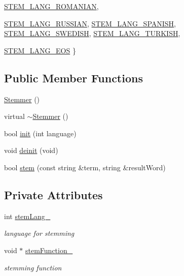 \begin{CompactItemize}
\hyperlink{classla__manager_1_1stem_1_1Stemmer_9b35ed1ce313d309f8c7235f7052e73e1cdb1626cfd2146d69cb9d45d2425c0a}{STEM\_\-LANG\_\-ROMANIAN}, 
\par
\hyperlink{classla__manager_1_1stem_1_1Stemmer_9b35ed1ce313d309f8c7235f7052e73e0b2c1c2f4ce7f5c0c6f217c3ce8c7295}{STEM\_\-LANG\_\-RUSSIAN}, 
\hyperlink{classla__manager_1_1stem_1_1Stemmer_9b35ed1ce313d309f8c7235f7052e73e813d57cdbedfee90180b2fae7d7667c5}{STEM\_\-LANG\_\-SPANISH}, 
\hyperlink{classla__manager_1_1stem_1_1Stemmer_9b35ed1ce313d309f8c7235f7052e73e649924e5a6bdede8f2ebf229a74ab55f}{STEM\_\-LANG\_\-SWEDISH}, 
\hyperlink{classla__manager_1_1stem_1_1Stemmer_9b35ed1ce313d309f8c7235f7052e73ec67c8d74c084aa2aa2bbe20333329f0d}{STEM\_\-LANG\_\-TURKISH}, 
\par
\hyperlink{classla__manager_1_1stem_1_1Stemmer_9b35ed1ce313d309f8c7235f7052e73e826b3d8ecab89bcfe59eadd7ad77772d}{STEM\_\-LANG\_\-EOS}
 \}
\subsection*{Public Member Functions}
\begin{CompactItemize}
\item 
\hyperlink{classla__manager_1_1stem_1_1Stemmer_45be8edf4092fd45cdc2372add2b225a}{Stemmer} ()
\item 
virtual \hyperlink{classla__manager_1_1stem_1_1Stemmer_e54d92f62c8e22bd9576d37358f9b40b}{$\sim$Stemmer} ()
\item 
bool \hyperlink{classla__manager_1_1stem_1_1Stemmer_63dc57b0526d83e3de922f71441e0ba7}{init} (int language)
\item 
void \hyperlink{classla__manager_1_1stem_1_1Stemmer_2c61f6050413b747587df7cdf7a00105}{deinit} (void)
\item 
bool \hyperlink{classla__manager_1_1stem_1_1Stemmer_6c0434f1b3756181a02159e3d4f537bd}{stem} (const string \&term, string \&resultWord)
\end{CompactItemize}
\subsection*{Private Attributes}
\begin{CompactItemize}
\item 
int \hyperlink{classla__manager_1_1stem_1_1Stemmer_e906ff2a7307d68e33607699ee74ea33}{stemLang\_\-}
\begin{CompactList}\small\item\em language for stemming \item\end{CompactList}\item 
void $\ast$ \hyperlink{classla__manager_1_1stem_1_1Stemmer_f1e057f236da8a9454b8003391c68c7c}{stemFunction\_\-}
\begin{CompactList}\small\item\em stemming function \item\end{CompactList}\end{CompactItemize}



\end{CompactItemize}
